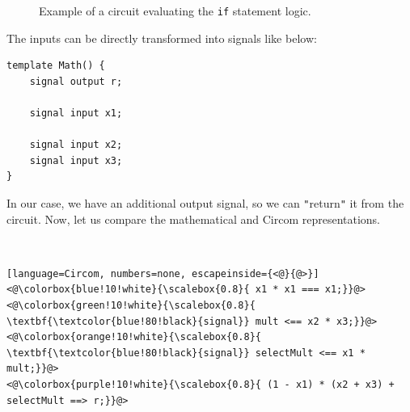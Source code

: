 \documentclass[../../book.tex]{subfiles}
\begin{document}
\begin{figure}[h!]
{
    }
    \caption{Example of a circuit evaluating the \texttt{if} statement logic.}
    \label{fig:polynomial-circuit}
\end{figure}

The inputs can be directly transformed into signals like below:
\begin{lstlisting}[language=Circom]
template Math() {
    signal output r;

    signal input x1;

    signal input x2;
    signal input x3;
}
\end{lstlisting}

In our case, we have an additional output signal, so we can \texttt{"}return\texttt{"} it from the circuit.
Now, let us compare the mathematical and Circom representations.

\newsavebox{\circomcode}

\begin{lrbox}{\circomcode}
\begin{minipage}{6cm} %
    \centering
     \\[1ex] %
    \begin{lstlisting}[language=Circom, numbers=none, escapeinside={<@}{@>}]
<@\colorbox{blue!10!white}{\scalebox{0.8}{ x1 * x1 === x1;}}@>
<@\colorbox{green!10!white}{\scalebox{0.8}{ \textbf{\textcolor{blue!80!black}{signal}} mult <== x2 * x3;}}@>
<@\colorbox{orange!10!white}{\scalebox{0.8}{ \textbf{\textcolor{blue!80!black}{signal}} selectMult <== x1 * mult;}}@>
<@\colorbox{purple!10!white}{\scalebox{0.8}{ (1 - x1) * (x2 + x3) + selectMult ==> r;}}@>
    \end{lstlisting}
\end{minipage}
\end{lrbox}
\end{document}
